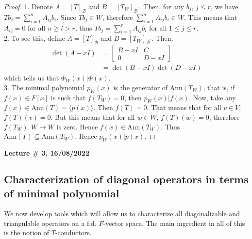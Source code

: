 \documentclass[letterpaper,11pt,twoside]{article}
\theoremstyle{definition}
\theoremstyle{definition}
\theoremstyle{definition}
\theoremstyle{definition}
\theoremstyle{definition}
\theoremstyle{definition}
\theoremstyle{remark}
\theoremstyle{definition}
\newcommand{\newlecture}[2]{\begin{center}
    \textbf{Lecture \# #1, #2}
\end{center}}
\newcommand{\Ann}[1]{\text{Ann}\left(#1\right)}
\newcommand{\gen}[1]{\langle #1\rangle}
\begin{document}
    \begin{proof}
    1. Denote $A = [T]_{\mathcal{B}}$ and $B = [T_W]_{\mathcal{B}^\prime}$. Then, for any $b_j $, $j\le r$, we have $Tb_j = \sum_{i=1}^nA_{ij}b_i$. Since $Tb_j \in W$, therefore $\sum_{i=1}^nA_{ij}b_i \in W$. This means that $A_{ij} = 0$ for all $n\ge i>r$, thus $Tb_j = \sum_{i=1}^rA_{ij}b_i$ for all $1\le j\le r$.\\
    
    2. To see this, define $A = [T]_{\mathcal{B}}$ and $B = [T_W]_{\mathcal{B}^\prime}$. Then, 
    \begin{align*}
        \det (A-xI) &= \begin{bmatrix}
            B-xI &C\\
            0& D-xI
        \end{bmatrix}\\
        &= \det (B-xI) \det (D-xI)
    \end{align*}
    which tells us that $\Phi_W(x) | \Phi(x)$.\\
    
    3. The minimal polynomial $p_W(x)$ is the generator of $\Ann{T_W}$, that is, if $f(x) \in F[x]$ is such that $f(T_W) = 0$, then $p_W(x) | f(x)$. Now, take any $f(x)\in \Ann{T} = \gen{p(x)}$. Then $f(T) = 0$. That means that for all $v\in V$, $f(T)(v) = 0$. But this means that for all $w\in W$, $f(T)(w) = 0$, therefore $f(T_W) : W\to W$ is zero. Hence $f(x)\in \Ann{T_W}$. Thus $\Ann{T} \subseteq \Ann{T_W}$. Hence $p_W(x) | p(x)$.
    \end{proof}
    \newlecture{3}{16/08/2022}
    \subsection{Characterization of diagonal operators in terms of minimal polynomial}
    We now develop tools which will allow us to characterize all diagonalizable and triangulable operators on a f.d. $F$-vector space. The main ingredient in all of this is the notion of $T$-conductors.\\
    
\end{document}

